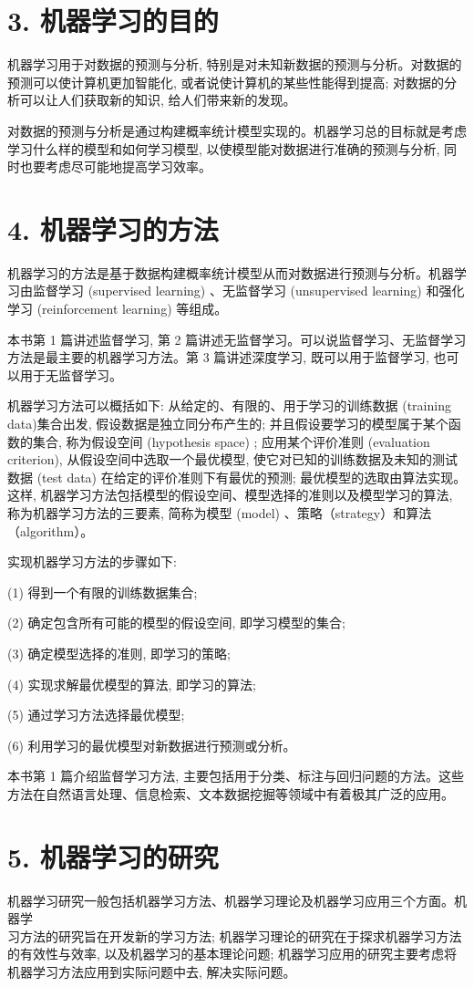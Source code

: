 \documentclass[10pt]{article}
\begin{document}
\begin{CJK*}{UTF8}{bsmi}
\section*{3. 机器学习的目的}
机器学习用于对数据的预测与分析, 特别是对未知新数据的预测与分析。对数据的预测可以使计算机更加智能化, 或者说使计算机的某些性能得到提高; 对数据的分析可以让人们获取新的知识, 给人们带来新的发现。

对数据的预测与分析是通过构建概率统计模型实现的。机器学习总的目标就是考虑学习什么样的模型和如何学习模型, 以使模型能对数据进行准确的预测与分析, 同时也要考虑尽可能地提高学习效率。

\section*{4. 机器学习的方法}
机器学习的方法是基于数据构建概率统计模型从而对数据进行预测与分析。机器学习由监督学习 (supervised learning) 、无监督学习 (unsupervised learning) 和强化学习 (reinforcement learning) 等组成。

本书第 1 篇讲述监督学习, 第 2 篇讲述无监督学习。可以说监督学习、无监督学习方法是最主要的机器学习方法。第 3 篇讲述深度学习, 既可以用于监督学习, 也可以用于无监督学习。

机器学习方法可以概括如下: 从给定的、有限的、用于学习的训练数据 (training data)集合出发, 假设数据是独立同分布产生的; 并且假设要学习的模型属于某个函数的集合, 称为假设空间 (hypothesis space) ; 应用某个评价准则 (evaluation criterion), 从假设空间中选取一个最优模型, 使它对已知的训练数据及未知的测试数据 (test data) 在给定的评价准则下有最优的预测; 最优模型的选取由算法实现。这样, 机器学习方法包括模型的假设空间、模型选择的准则以及模型学习的算法, 称为机器学习方法的三要素, 简称为模型 (model) 、策略（strategy）和算法（algorithm）。

实现机器学习方法的步骤如下:

(1) 得到一个有限的训练数据集合;

(2) 确定包含所有可能的模型的假设空间, 即学习模型的集合;

(3) 确定模型选择的准则, 即学习的策略;

(4) 实现求解最优模型的算法, 即学习的算法;

(5) 通过学习方法选择最优模型;

(6) 利用学习的最优模型对新数据进行预测或分析。

本书第 1 篇介绍监督学习方法, 主要包括用于分类、标注与回归问题的方法。这些方法在自然语言处理、信息检索、文本数据挖掘等领域中有着极其广泛的应用。

\section*{5. 机器学习的研究}
机器学习研究一般包括机器学习方法、机器学习理论及机器学习应用三个方面。机器学\\
习方法的研究旨在开发新的学习方法; 机器学习理论的研究在于探求机器学习方法的有效性与效率, 以及机器学习的基本理论问题; 机器学习应用的研究主要考虑将机器学习方法应用到实际问题中去, 解决实际问题。


\end{CJK*}
\end{document}
